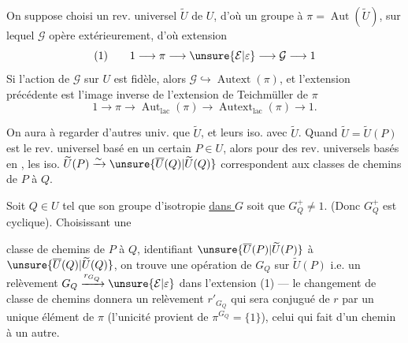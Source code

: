 
On suppose choisi un rev. universel $\widetilde U$ de $U$, d'où un groupe à  $\pi=\operatorname{Aut}(\widetilde U)$, sur lequel $\mathcal G$ opère extérieurement, d'où extension
\[
(1)\qquad 1\longrightarrow\pi\longrightarrow\unsure{\mathcal E|\varepsilon}\longrightarrow\mathcal G\longrightarrow 1
\]
Si l'action de $\mathcal G$ sur $U$  est fidèle,
alors $\mathcal G\hookrightarrow\operatorname{Autext}(\pi)$, et l'extension précédente est l'image inverse de l'extension de Teichmüller de $\pi$
\[
1\longrightarrow\pi\longrightarrow\operatorname{Aut}_{\mathrm{lac}}(\pi)\longrightarrow\operatorname{Autext}_{\mathrm{lac}}(\pi)\longrightarrow 1.
\]

 On aura à regarder d'autres  univ. que $\widetilde U$, et leurs iso. avec $\widetilde U$.
Quand $\widetilde U=\widetilde U(P)$ est le rev. universel basé en un certain $P\in U$, alors pour des rev. universels  basés en   ,
les iso. $\widetilde U(P)\xrightarrow{\sim}\unsure{\overline U(Q)|\widetilde U(Q)}$ correspondent  aux classes de chemins de $P$ à $Q$.

Soit  $Q\in U$ tel que son groupe d'isotropie   \uline{dans $G$} soit  que $G_Q^+\ne1$.
(Donc $G_Q^+$ est cyclique). Choisissant une


classe de chemins \inserted{$\lambda$} de $P$ à $Q$, identifiant $\unsure{\overline U(P)|\widetilde U(P)}$ à $\unsure{\overline U(Q)|\widetilde U(Q)}$, on trouve une opération de $G_Q$ sur $\widetilde U(P)$ i.e. un relèvement $G_Q\xrightarrow{r_{G_Q}}\unsure{\mathcal E|\varepsilon}$ dans l'extension (1) --- le changement de classe de chemins  donnera un relèvement $r'_{G_Q}$ qui  sera conjugué de $r$ par un unique élément de $\pi$  (l'unicité provient de $\pi^{G_Q}=\{1\}$),  celui qui fait  d'un chemin à un autre.

